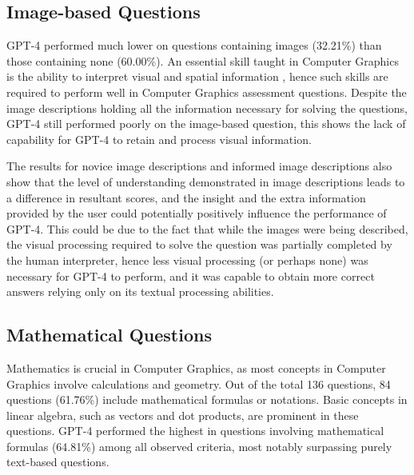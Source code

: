 \documentclass[sigconf,authordraft]{acmart}
\begin{document}
\subsection{Image-based Questions}
GPT-4 performed much lower on questions containing images (32.21\%) than those containing none (60.00\%). An essential skill taught in Computer Graphics is the ability to interpret visual and spatial information \cite{visual}, hence such skills are required to perform well in Computer Graphics assessment questions. Despite the image descriptions holding all the information necessary for solving the questions, GPT-4 still performed poorly on the image-based question, this shows the lack of capability for GPT-4 to retain and process visual information.

The results for novice image descriptions and informed image descriptions also show that the level of understanding demonstrated in image descriptions leads to a difference in resultant scores, and the insight and the extra information provided by the user could potentially positively influence the performance of GPT-4. This could be due to the fact that while the images were being described, the visual processing required to solve the question was partially completed by the human interpreter, hence less visual processing (or perhaps none) was necessary for GPT-4 to perform, and it was capable to obtain more correct answers relying only on its textual processing abilities.


\subsection{Mathematical Questions}
Mathematics is crucial in Computer Graphics, as most concepts in Computer Graphics involve calculations and geometry. Out of the total 136 questions, 84 questions (61.76\%) include mathematical formulas or notations. Basic concepts in linear algebra, such as vectors and dot products, are prominent in these questions. GPT-4 performed the highest in questions involving mathematical formulas (64.81\%) among all observed criteria, most notably surpassing purely text-based questions.
\end{document}
